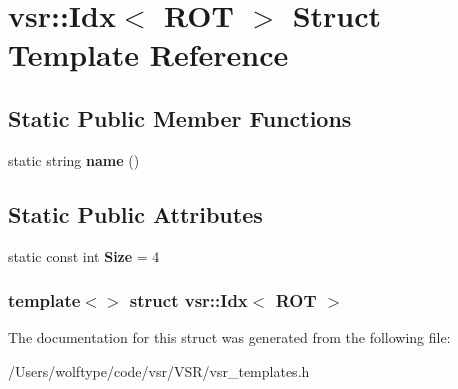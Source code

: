 \hypertarget{structvsr_1_1_idx_3_01_r_o_t_01_4}{\section{vsr\-:\-:Idx$<$ R\-O\-T $>$ Struct Template Reference}
\label{structvsr_1_1_idx_3_01_r_o_t_01_4}
}
\subsection*{Static Public Member Functions}
\begin{DoxyCompactItemize}
\item 
\hypertarget{structvsr_1_1_idx_3_01_r_o_t_01_4_ada2e8ba6a01dd7cf9222d9a1e427756e}{static string {\bfseries name} ()}\label{structvsr_1_1_idx_3_01_r_o_t_01_4_ada2e8ba6a01dd7cf9222d9a1e427756e}

\end{DoxyCompactItemize}
\subsection*{Static Public Attributes}
\begin{DoxyCompactItemize}
\item 
\hypertarget{structvsr_1_1_idx_3_01_r_o_t_01_4_acb4a6004b49e32314e5dcb4c8ff95ade}{static const int {\bfseries Size} = 4}\label{structvsr_1_1_idx_3_01_r_o_t_01_4_acb4a6004b49e32314e5dcb4c8ff95ade}

\end{DoxyCompactItemize}
\subsubsection*{template$<$$>$ struct vsr\-::\-Idx$<$ R\-O\-T $>$}



The documentation for this struct was generated from the following file\-:\begin{DoxyCompactItemize}
\item 
/\-Users/wolftype/code/vsr/\-V\-S\-R/vsr\-\_\-templates.\-h\end{DoxyCompactItemize}
